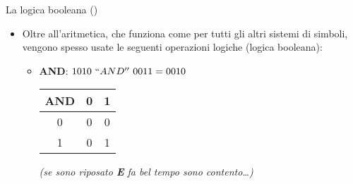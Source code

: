 %
%
%
%
%
\setcounter{ms}{1}
\begin{slide}{La logica booleana ()}
{
	\begin{itemize}

		\item Oltre all'aritmetica, che funziona come per tutti gli altri
		      sistemi di simboli, vengono spesso usate le seguenti
			  operazioni logiche (logica booleana):

			\vspace*{10mm}
			\begin{itemize}

				\item {\bfseries AND}: $1010~``AND''~0011 = 0010$
					\hfill
					\begin{tabular}{c | c c}
						AND & 0 & 1\\
						\hline
						0 & 0 & 0\\
						1 & 0 & 1\\
					\end{tabular}

					{\itshape (se sono riposato {\bfseries E}
					fa bel tempo sono contento\ldots)}

				\end{itemize}

	\end{itemize}
}
\end{slide}


